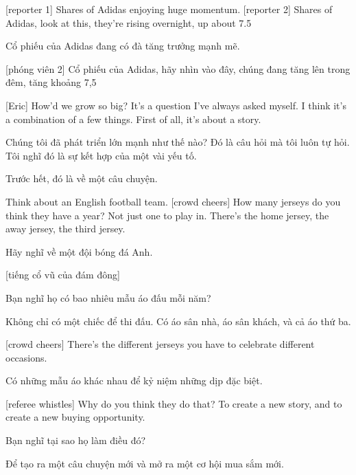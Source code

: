 \documentclass[a4paper]{article}
\begin{document}
	[reporter 1] Shares of Adidas enjoying huge momentum.
	[reporter 2] Shares of Adidas, look at this, they're rising overnight, up about 7.5%
	
	\begin{vietnamese-v2}
		 Cổ phiếu của Adidas đang có đà tăng trưởng mạnh mẽ.
		
		[phóng viên 2] Cổ phiếu của Adidas, hãy nhìn vào đây, chúng đang tăng lên trong đêm, tăng khoảng 7,5%
	\end{vietnamese-v2}
	
	
	[Eric] How'd we grow so big? It's a question I've always asked myself. I think it's a combination of a few things.
	First of all, it's about a story. 
	
	\begin{vietnamese-v2}
		[Eric] Chúng tôi đã phát triển lớn mạnh như thế nào? Đó là câu hỏi mà tôi luôn tự hỏi. Tôi nghĩ đó là sự kết hợp của một vài yếu tố.
		
		Trước hết, đó là về một câu chuyện.
	\end{vietnamese-v2}
	
	Think about an English football team.
	[crowd cheers]
	How many jerseys do you think they have a year?
	Not just one to play in. There's the home jersey, the away jersey, the third jersey.
	
	\begin{vietnamese-v2}
		Hãy nghĩ về một đội bóng đá Anh.
		
		[tiếng cổ vũ của đám đông]
		
		Bạn nghĩ họ có bao nhiêu mẫu áo đấu mỗi năm?
		
		Không chỉ có một chiếc để thi đấu. Có áo sân nhà, áo sân khách, và cả áo thứ ba.
	\end{vietnamese-v2}
	
	[crowd cheers]
	There's the different jerseys you have to celebrate different occasions.
	
	\begin{vietnamese-v2}
		
		Có những mẫu áo khác nhau để kỷ niệm những dịp đặc biệt.
	\end{vietnamese-v2}
	
	[referee whistles]
	Why do you think they do that?
	To create a new story, and to create a new buying opportunity.
	
	\begin{vietnamese-v2}
		
		Bạn nghĩ tại sao họ làm điều đó?
		
		Để tạo ra một câu chuyện mới và mở ra một cơ hội mua sắm mới.
	\end{vietnamese-v2}
	
\end{document}
